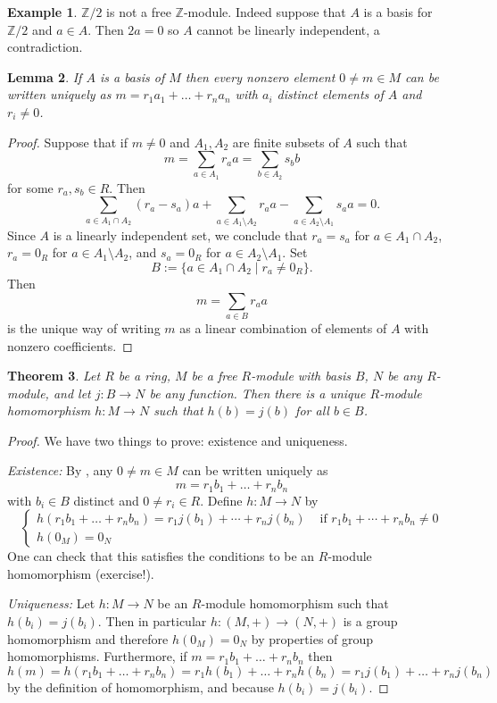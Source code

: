 \documentclass[12pt]{report}
\newtheorem{theorem}{Theorem}[chapter]
\newtheorem{lemma}[theorem]{Lemma}
\numberwithin{equation}{section}
\numberwithin{theorem}{chapter}
\theoremstyle{definition}
\newtheorem{example}[theorem]{Example}
\newtheorem*{basic properties}{Basic Properties}
\newtheorem*{Important Remark}{Important Remark}
\begin{document}
\begin{example}
$\mathbb{Z}/2$ is not a free $\mathbb{Z}$-module. Indeed suppose that $A$ is a basis for $\mathbb{Z}/2$ and $a\in A$. Then $2a=0$ so $A$ cannot be linearly independent, a contradiction.
\end{example}

\begin{lemma}\label{lem:uniquelincomb}
If $A$ is a basis of $M$ then every nonzero element $0\neq m\in M$ can be written uniquely as $m=r_1a_1 + \dots + r_na_n$ with $a_i$ distinct elements of $A$ and $r_i\neq 0$.
\end{lemma}

\begin{proof}
Suppose that if $m\neq 0$ and $A_1,A_2$ are finite subsets of $A$ such that 
$$m=\sum_{a\in A_1}r_aa=\sum_{b\in A_2}s_bb$$
for some $r_a, s_b \in R$.
Then
$$\sum_{a\in A_1\cap A_2} (r_a-s_a)a+\sum_{a\in A_1\setminus A_2} r_aa-\sum_{a \in A_2\setminus A_1} s_aa=0.$$
Since $A$ is a linearly independent set, we conclude that $r_a=s_a$ for $a\in A_1\cap A_2$, $r_a=0_R$ for $a\in A_1\setminus A_2$, and $s_a=0_R$ for $a \in A_2\setminus A_1$. Set 
$$B := \{a \in A_1\cap A_2 \mid r_a \neq 0_R\}.$$ 
Then 
$$m = \displaystyle\sum_{a\in B}r_aa$$
is the unique way of writing $m$ as a linear combination of elements of $A$ with nonzero coefficients.
\end{proof}




\begin{theorem}\label{UMPfreemod}
 Let $R$ be a ring, $M$ be a free $R$-module with basis $B$, $N$ be any $R$-module, and let $j: B \to N$ be any function. Then there is a unique $R$-module homomorphism $h: M \to N$ such that $h(b) = j(b)$ for all $b \in B$.
\end{theorem}


\begin{proof}
We have two things to prove: existence and uniqueness.

\noindent
{\em Existence:} By , any $0\neq m\in M$ can be written uniquely as 
$$m=r_1b_1+\dots+r_nb_n$$ 
with $b_i\in B$ distinct and $0 \neq r_i \in R$. Define $h\!: M \to N$ by
$$\begin{cases}
h(r_1b_1+\dots+r_nb_n) = r_1j(b_1) + \cdots +r_nj(b_n) & \text{ if } r_1b_1 + \cdots + r_nb_n \neq 0\\
h(0_M)=0_N
\end{cases}$$
One can check that this satisfies the conditions to be an $R$-module homomorphism (exercise!).

{\em Uniqueness:} Let $h:M\to N$ be an $R$-module homomorphism such that $h(b_i)=j(b_i)$. Then in particular $h\!:(M,+)\to (N,+)$ is a group homomorphism and therefore $h(0_M)=0_N$ by properties of group homomorphisms. Furthermore, if $m=r_1b_1+\dots+r_nb_n$ then 
$$h(m)=h(r_1b_1+\dots+r_nb_n)=r_1h(b_1)+\dots+r_nh(b_n)=r_1j(b_1)+\dots+r_nj(b_n)$$ 
by the definition of homomorphism, and because $h(b_i)=j(b_i)$. 
\end{proof}
\end{document}
